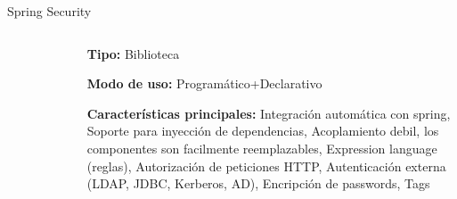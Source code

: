 \documentclass[12pt]{beamer}
\begin{document}
\begin{frame}{Spring Security}
  \begin{columns}
      \begin{column}{.5\linewidth}
  	    \begin{figure}
  	    \centering
  	    \includegraphics[width=0.6\linewidth]{Images/spring.png}
  	    \end{figure}
      \end{column}
    \begin{column}{.5\linewidth}
\textbf{Tipo:} Biblioteca

\textbf{Modo de uso:} Programático+Declarativo

\textbf{Características principales:}
Integración automática con spring,
Soporte para inyección de dependencias,
Acoplamiento debil, los componentes son facilmente reemplazables,
Expression language (reglas),
Autorización de peticiones HTTP,
Autenticación externa (LDAP, JDBC, Kerberos, AD),
Encripción de passwords,
Tags
    \end{column}

  \end{columns}
\end{frame}
\end{document}
